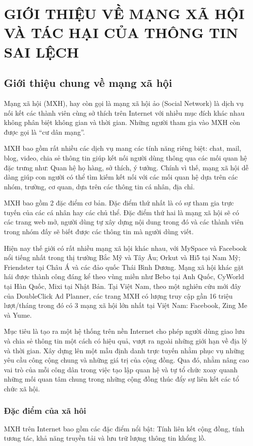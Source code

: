 \chapter{GIỚI THIỆU VỀ MẠNG XÃ HỘI VÀ TÁC HẠI CỦA THÔNG TIN SAI LỆCH }

\section{Giới thiệu chung về mạng xã hội}
Mạng xã hội (MXH), hay còn gọi là mạng xã hội ảo (Social Network) là dịch vụ nối kết các thành viên cùng sở thích trên Internet với nhiều mục đích khác nhau không phân biệt không gian và thời gian. Những người tham gia vào MXH còn được gọi là “cư dân mạng”. 

MXH bao gồm rất nhiều các dịch vụ mang các tính năng riêng biệt: chat, mail, blog, video, chia sẻ thông tin giúp kết nối người dùng thông qua các mối quan hệ đặc trưng như: Quan hệ họ hàng, sở thích, ý tưởng. Chính vì thế, mạng xã hội dễ dàng giúp con người có thể tìm kiếm kết nối với các mối quan hệ dựa trên các nhóm, trường, cơ quan, dựa trên các thông tin cá nhân, địa chỉ. 

MXH bao gồm 2 đặc điểm cơ bản. Đặc điểm thứ nhất là có sự tham gia trực tuyến của các cá nhân hay các chủ thể. Đặc điểm thứ hai là mạng xã hội sẽ có các trang web mở, người dùng tự xây dựng nội dung trong đó và các thành viên trong nhóm đấy sẽ biết được các thông tin mà người dùng viết.

Hiện nay thế giới có rất nhiều mạng xã hội khác nhau, với MySpace và Facebook nổi tiếng nhất trong thị trường Bắc Mỹ và Tây Âu; Orkut và Hi5 tại Nam Mỹ; Friendster tại Châu Á và các đảo quốc Thái Bình Dương. Mạng xã hội khác gặt hái được thành công đáng kể theo vùng miền như Bebo tại Anh Quốc, CyWorld tại Hàn Quốc, Mixi tại Nhật Bản. Tại Việt Nam, theo một nghiên cứu mới đây của DoubleClick Ad Planner, các trang MXH có lượng truy cập gần 16 triệu lượt/tháng trong đó có 3 mạng xã hội lớn nhất tại Việt Nam: Facebook, Zing Me và Yume.

Mục tiêu là tạo ra một hệ thống trên nền Internet cho phép người dùng giao lưu và chia sẻ thông tin một cách có hiệu quả, vượt ra ngoài những giới hạn về địa lý và thời gian. Xây dựng lên một mẫu định danh trực tuyến nhằm phục vụ những yêu cầu công cộng chung và những giá trị của cộng đồng. Qua đó, nhằm nâng cao vai trò của mỗi công dân trong việc tạo lập quan hệ và tự tổ chức xoay quanh những mối quan tâm chung trong những cộng đồng thúc đẩy sự liên kết các tổ chức xã hội.
	\subsection{Đặc điểm của xã hôi}
	MXH trên Internet bao gồm các đặc điểm nổi bật: Tính liên kết cộng đồng, tính tương tác, khả năng truyền tải và lưu trữ lượng thông tin khổng lồ.
